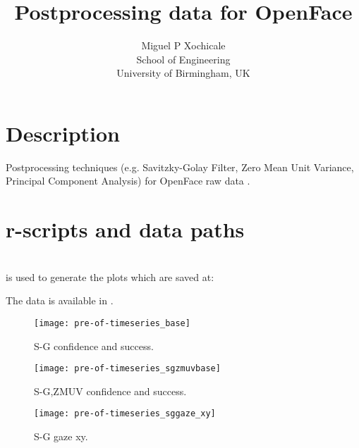 \documentclass[a4paper,12pt]{article}
\title{Postprocessing data for OpenFace}
\author{Miguel P Xochicale \\
School of Engineering\\
University of Birmingham, UK}
\begin{document}
\maketitle

%


\section{Description}


Postprocessing techniques (e.g. Savitzky-Golay Filter, Zero Mean Unit Variance, Principal Component Analysis)
for OpenFace raw data \cite{baltrusaitis2016}.


\section{r-scripts and data paths}
 \\
is used to generate the plots which are saved at: \\


The data is available in \cite{mxochicale2018}.










\begin{figure}
\centering
\texttt{[image: pre-of-timeseries\_base]}
\caption{S-G confidence and success.}
\end{figure}


\begin{figure}
\centering
\texttt{[image: pre-of-timeseries\_sgzmuvbase]}
\caption{S-G,ZMUV confidence and success.}
\end{figure}






\begin{figure}
\centering
\texttt{[image: pre-of-timeseries\_sggaze\_xy]}
\caption{S-G gaze xy.}
\end{figure}
\end{document}

